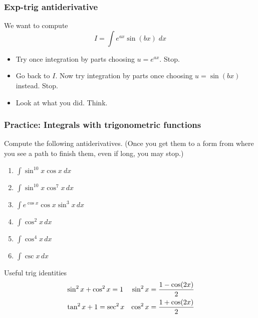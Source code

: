 \documentclass[14pt]{beamer}
\newcommand {\DS} [1] {${\displaystyle #1}$}
\newcommand{\setsize}[1]{\fontsize{#1}{#1}\selectfont} %
\newcommand{\smallerfont}{\setsize{13}} %
\newcommand{\vv}{\vspace{.2cm}}
\begin{document}
\begin{frame}[t]
\frametitle{Exp-trig antiderivative}

We want to compute
	$$
		I = \int e^{ax} \sin (bx) \; dx
	$$
\begin{itemize}
		\item Try once integration by parts choosing \DS{u = e^{ax}}.  Stop.
		\item Go back to $I$.  Now try integration by parts once choosing \DS{u = \sin (bx)} instead.  Stop.
		\item  Look at what you did.  Think.
\end{itemize}

\end{frame}
\begin{frame}[t]
\smallerfont
\frametitle{Practice: Integrals with trigonometric functions}

Compute the following antiderivatives.  (Once you get them to a form from where you see a path to finish them, even if long, you may stop.)
  
\begin{multicols}{2}
	\begin{enumerate}
		\item  \DS{ \int \sin^{10} x \cos x \ dx }
		\vv
		\item \DS{\int \sin^{10} x \cos^{7} x \, dx}
		\vv
		\item \DS{\int e^{\cos x}  \cos x \sin^3 x \, dx}
		\vv
		\item \DS{\int  \cos^2 x \, dx}
		\vv
		\item \DS{\int  \cos^4x  \, dx}
		\vv
		\item \DS{\int  \csc x \, dx}
		\vv
	\end{enumerate}
\end{multicols}

\vspace{-.5cm}
{\setsize{10}
\begin{block}{ \setsize{12} Useful trig identities}  \vspace{-.5cm}
	\begin{align*} \large
		&\sin^2 x + \cos^2 x = 1
			&
		\sin^2 x &= \frac{1 - \cos (2x)}{2}		
			\\
		&\tan^2 x + 1 = \sec^2 x
			&
		\cos^2 x &= \frac{1 + \cos (2x)}{2}
	\end{align*}
\end{block}
}

\end{frame}
\end{document}
